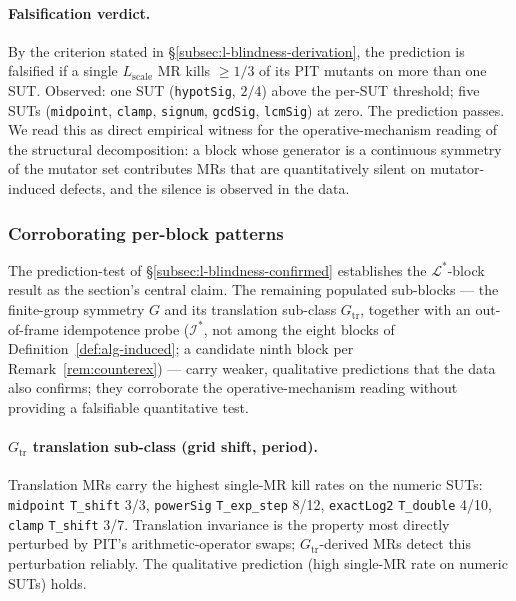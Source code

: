 \documentclass[manuscript]{acmart}
\begin{document}
\paragraph{Falsification verdict.}
By the criterion stated in \S\ref{subsec:l-blindness-derivation}, the
prediction is falsified if a single $L_{\mathrm{scale}}$ MR kills
$\ge 1/3$ of its PIT mutants on more than one SUT. Observed: one SUT
(\texttt{hypotSig}, $2/4$) above the per-SUT threshold; five SUTs
(\texttt{midpoint}, \texttt{clamp}, \texttt{signum}, \texttt{gcdSig},
\texttt{lcmSig}) at zero. The prediction passes. We read this as
direct empirical witness for the operative-mechanism reading of the
structural decomposition: a block whose generator is a continuous
symmetry of the mutator set contributes MRs that are quantitatively
silent on mutator-induced defects, and the silence is observed in
the data.

\subsubsection{Corroborating per-block patterns}
\label{subsec:other-blocks}

The prediction-test of
\S\ref{subsec:l-blindness-confirmed} establishes the
$\mathcal{L}^{*}$-block result as the section's central claim. The
remaining populated sub-blocks --- the finite-group symmetry $G$ and
its translation sub-class $G_{\mathrm{tr}}$, together with an
out-of-frame idempotence probe ($\mathcal{I}^{*}$, not among the eight
blocks of Definition~\ref{def:alg-induced}; a candidate ninth block
per Remark~\ref{rem:counterex}) --- carry weaker, qualitative
predictions that the data also confirms; they corroborate the
operative-mechanism reading without providing a falsifiable
quantitative test.

\paragraph{$G_{\mathrm{tr}}$ translation sub-class (grid shift, period).}
Translation MRs carry the highest single-MR kill rates on the numeric
SUTs: \texttt{midpoint} \texttt{T\_shift} 3/3, \texttt{powerSig}
\texttt{T\_exp\_step} 8/12, \texttt{exactLog2} \texttt{T\_double}
4/10, \texttt{clamp} \texttt{T\_shift} 3/7. Translation invariance is
the property most directly perturbed by PIT's arithmetic-operator
swaps; $G_{\mathrm{tr}}$-derived MRs detect this perturbation reliably. The
qualitative prediction (high single-MR rate on numeric SUTs) holds.
\end{document}

